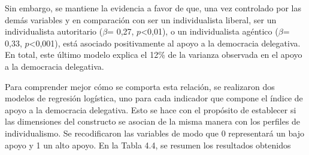 \documentclass[12pt,twoside]{templates/facsothesis}
\begin{document}
Sin embargo, se mantiene la evidencia a favor de que, una vez controlado por las demás variables y en comparación con ser un individualista liberal, ser un individualista autoritario (\(\beta\)= 0,27, \(p\)\textless0,01), o un individualista agéntico (\(\beta\)= 0,33, \(p\)\textless0,001), está asociado positivamente al apoyo a la democracia delegativa. En total, este último modelo explica el 12\% de la varianza observada en el apoyo a la democracia delegativa.

Para comprender mejor cómo se comporta esta relación, se realizaron dos modelos de regresión logística, uno para cada indicador que compone el índice de apoyo a la democracia delegativa. Esto se hace con el propósito de establecer si las dimensiones del constructo se asocian de la misma manera con los perfiles de individualismo. Se recodificaron las variables de modo que 0 representará un bajo apoyo y 1 un alto apoyo. En la Tabla 4.4, se resumen los resultados obtenidos
\end{document}
